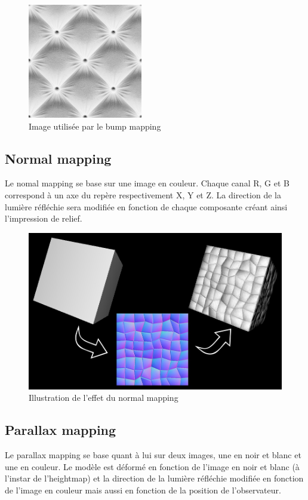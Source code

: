 \documentclass[11pt]{report}
\begin{document}
\begin{figure}[htbp]
\centering
\includegraphics[width=5cm]{bump.png}
\caption{Image utilisée par le bump mapping}
\end{figure}

\subsection{Normal mapping}

Le nomal mapping se base sur une image en couleur. Chaque canal R, G et B correspond à un axe du repère respectivement X, Y et Z. La direction de la lumière réfléchie sera modifiée en fonction de chaque composante créant ainsi l’impression de relief.

\begin{figure}[htbp]
\centering
\includegraphics[scale=0.30]{normal_mapping.jpg}
\caption{Illustration de l'effet du normal mapping}
\end{figure}

\subsection{Parallax mapping}

Le parallax mapping se base quant à lui sur deux images, une en noir et blanc et une en couleur. Le modèle est déformé en fonction de l’image en noir et blanc (à l'instar de l’heightmap) et la direction de la lumière réfléchie modifiée en fonction de l’image en couleur mais aussi en fonction de la position de l’observateur.
\end{document}
